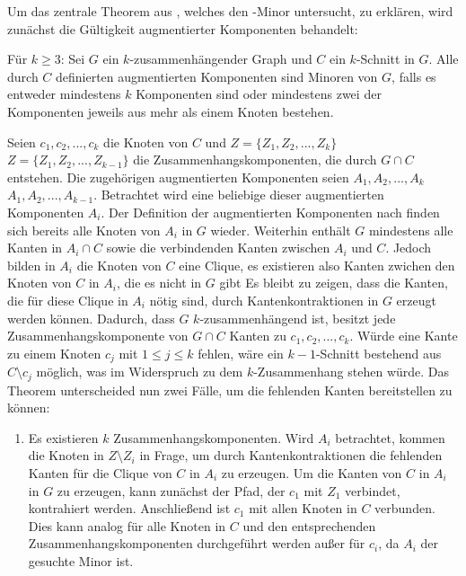 Um das zentrale Theorem aus \cite{Kez92}, welches den \kdd-Minor untersucht, zu erklären, wird zunächst die Gültigkeit augmentierter Komponenten behandelt:
\begin{theorem}\label{Theorem33}
  Für $k \geq 3$: Sei $G$ ein $k$-zusammenhängender Graph und $C$ ein $k$-Schnitt in $G$.
  Alle durch $C$ definierten augmentierten Komponenten sind Minoren von $G$, falls es entweder mindestens $k$ Komponenten sind oder mindestens zwei der Komponenten jeweils aus mehr als einem Knoten bestehen.
\end{theorem}
\begin{beweis}
  Seien $c_1, c_2, ..., c_k$ die Knoten von $C$ und $Z = \{Z_1, Z_2, ..., Z_k\}$ \bzw $Z = \{Z_1, Z_2, ..., Z_{k-1}\}$ die Zusammenhangskomponenten, die durch $G \cap C$ entstehen.
  Die zugehörigen augmentierten Komponenten seien $A_1, A_2, ..., A_k$ \bzw $A_1, A_2, ..., A_{k-1}$.
  Betrachtet wird eine beliebige dieser augmentierten Komponenten $A_i$.
  Der Definition der augmentierten Komponenten nach finden sich bereits alle Knoten von $A_i$ in $G$ wieder.
  Weiterhin enthält $G$ mindestens alle Kanten in $A_i \cap C$ sowie die verbindenden Kanten zwischen $A_i$ und $C$.
  Jedoch bilden in $A_i$ die Knoten von $C$ eine Clique, es existieren also \ggf Kanten zwichen den Knoten von $C$ in $A_i$, die es nicht in $G$ gibt
  Es bleibt zu zeigen, dass die Kanten, die für diese Clique in $A_i$ nötig sind, durch Kantenkontraktionen in $G$ erzeugt werden können.
  Dadurch, dass $G$ $k$-zusammenhängend ist, besitzt jede Zusammenhangskomponente von $G \cap C$ Kanten zu $c_1, c_2, ..., c_k$.
  Würde eine Kante zu einem Knoten $c_j$ mit $1 \leq j \leq k$ fehlen, wäre ein $k-1$-Schnitt bestehend aus $C \setminus c_j$ möglich, was im Widerspruch zu dem $k$-Zusammenhang stehen würde.
  Das Theorem unterscheided nun zwei Fälle, um die fehlenden Kanten bereitstellen zu können:
  \begin{enumerate}
    \item Es existieren $k$ Zusammenhangskomponenten.
          Wird $A_i$ betrachtet, kommen die Knoten in $Z \setminus Z_i$ in Frage, um durch Kantenkontraktionen die fehlenden Kanten für die Clique von $C$ in $A_i$ zu erzeugen.
          Um die Kanten von $C$ in $A_i$ in $G$ zu erzeugen, kann zunächst der Pfad, der $c_1$ mit $Z_1$ verbindet, kontrahiert werden.
          Anschließend ist $c_1$ mit allen Knoten in $C$ verbunden.
          Dies kann analog für alle Knoten in $C$ und den entsprechenden Zusammenhangskomponenten durchgeführt werden außer für $c_i$, da $A_i$ der gesuchte Minor ist.

\end{enumerate}
\end{beweis}
